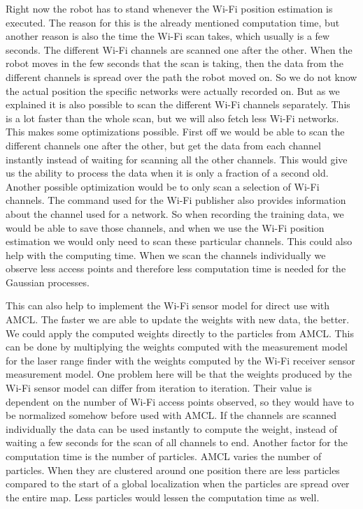 Right now the robot has to stand whenever the Wi-Fi position estimation is executed. The reason for this is the already mentioned computation time, but another reason is also the time the Wi-Fi scan takes, which usually is a few seconds. The different Wi-Fi channels are scanned one after the other. When the robot moves in the few seconds that the scan is taking, then the data from the different channels is spread over the path the robot moved on. So we do not know the actual position the specific networks were actually recorded on. But as we explained it is also possible to scan the different Wi-Fi channels separately. This is a lot faster than the whole scan, but we will also fetch less Wi-Fi networks. This makes some optimizations possible. First off we would be able to scan the different channels one after the other, but get the data from each channel instantly instead of waiting for scanning all the other channels. This would give us the ability to process the data when it is only a fraction of a second old. Another possible optimization would be to only scan a selection of Wi-Fi channels. The command used for the Wi-Fi publisher also provides information about the channel used for a network. So when recording the training data, we would be able to save those channels, and when we use the Wi-Fi position estimation we would only need to scan these particular channels. This could also help with the computing time. When we scan the channels individually we observe less access points and therefore less computation time is needed for the Gaussian processes. 

This can also help to implement the Wi-Fi sensor model for direct use with AMCL. The faster we are able to update the weights with new data, the better. We could apply the computed weights directly to the particles from AMCL. This can be done by multiplying the weights computed with the measurement model for the laser range finder with the weights computed by the Wi-Fi receiver sensor measurement model. One problem here will be that the weights produced by the Wi-Fi sensor model can differ from iteration to iteration. Their value is dependent on the number of Wi-Fi access points observed, so they would have to be normalized somehow before used with AMCL. If the channels are scanned individually the data can be used instantly to compute the weight, instead of waiting a few seconds for the scan of all channels to end.  Another factor for the computation time is the number of particles. AMCL varies the number of particles. When they are clustered around one position there are less particles compared to the start of a global localization when the particles are spread over the entire map. Less particles would lessen the computation time as well. 

